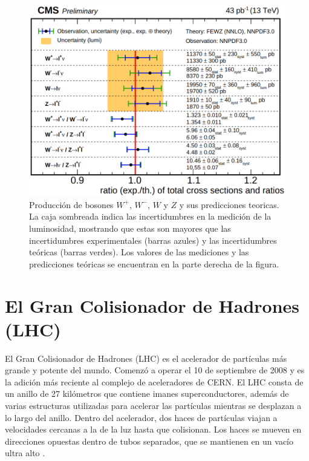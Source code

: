\begin{center}
  \begin{figure}[h]
    \centering
\includegraphics[scale=.28]{Chapter1/lumi_uncertainty.png} 
 \caption[Incertidumbre de la Luminosidad en un proceso]{Producción de bosones $W^+$, $W^-$, $W$ y $Z$ y sus predicciones teoricas. La caja sombreada indica las incertidumbres en la medición de la luminosidad, mostrando que estas son mayores que las incertidumbres experimentales (barras azules) y las incertidumbres teóricas (barras verdes). Los valores de las mediciones y las predicciones teóricas se encuentran en la parte derecha de la figura.}
    \label{lumi_incertainty}
  \end{figure}
\end{center}


\section{El Gran Colisionador de Hadrones (LHC)}
 
El Gran Colisionador de Hadrones (LHC) es el acelerador de partículas más grande y potente del mundo. Comenzó a operar el 10 de septiembre de 2008 y es la adición más reciente al complejo de aceleradores de CERN. El LHC consta de un anillo de 27 kilómetros que contiene imanes superconductores, además de varias estructuras utilizadas para acelerar las partículas mientras se desplazan a lo largo del anillo. Dentro del acelerador, dos haces de partículas viajan a velocidades cercanas a la de la luz hasta que colisionan. Los haces se mueven en direcciones opuestas dentro de tubos separados, que se mantienen en un vacío ultra alto \cite{LHC}.\\ 

